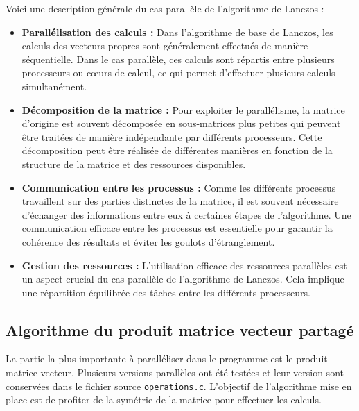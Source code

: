 \documentclass[11pt,french]{article}
\begin{document}
    Voici une description générale du cas parallèle de l'algorithme de Lanczos : \\
    \begin{itemize}

    \item \textbf{Parallélisation des calculs :} Dans l'algorithme de base de Lanczos, les calculs des vecteurs propres sont généralement effectués de manière séquentielle. Dans le cas parallèle, ces calculs sont répartis entre plusieurs processeurs ou cœurs de calcul, ce qui permet d'effectuer plusieurs calculs simultanément. \\
    \item \textbf{Décomposition de la matrice :} Pour exploiter le parallélisme, la matrice d'origine est souvent décomposée en sous-matrices plus petites qui peuvent être traitées de manière indépendante par différents processeurs. Cette décomposition peut être réalisée de différentes manières en fonction de la structure de la matrice et des ressources disponibles. \\
    \item \textbf{Communication entre les processus :} Comme les différents processus travaillent sur des parties distinctes de la matrice, il est souvent nécessaire d'échanger des informations entre eux à certaines étapes de l'algorithme. Une communication efficace entre les processus est essentielle pour garantir la cohérence des résultats et éviter les goulots d'étranglement. \\
    \item \textbf{Gestion des ressources :} L'utilisation efficace des ressources parallèles est un aspect crucial du cas parallèle de l'algorithme de Lanczos. Cela implique une répartition équilibrée des tâches entre les différents processeurs.
	\end{itemize}
	
	\subsection{Algorithme du produit matrice vecteur partagé}
		\par La partie la plus importante à paralléliser dans le programme est le produit matrice vecteur. Plusieurs versions parallèles ont été testées et leur version sont conservées dans le fichier source \texttt{operations.c}. L'objectif de l'algorithme mise en place est de profiter de la symétrie de la matrice pour effectuer les calculs.  \\
		
\end{document}
